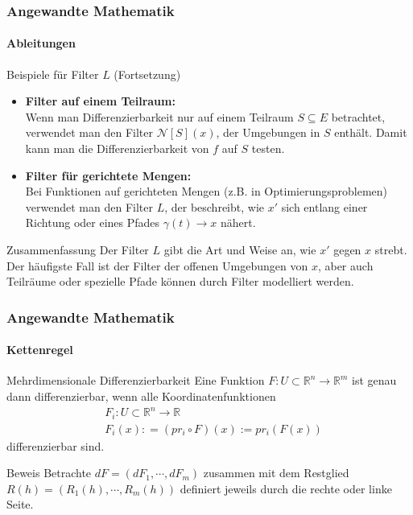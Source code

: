 \documentclass{beamer}
\begin{document}
\begin{frame}
    \frametitle{Angewandte Mathematik}
    \framesubtitle{Ableitungen}

\begin{block}{Beispiele für Filter \( L \) (Fortsetzung)}
  \begin{itemize}
      
    \item \textbf{Filter auf einem Teilraum:} \\
    Wenn man Differenzierbarkeit nur auf einem Teilraum \( S \subseteq E \) betrachtet, 
    verwendet man den Filter \( \mathcal{N}[S](x) \), der Umgebungen in \( S \) enthält. Damit kann man die Differenzierbarkeit von \( f \) auf \( S \) testen.
  
    \item \textbf{Filter für gerichtete Mengen:} \\
    Bei Funktionen auf gerichteten Mengen (z.B. in Optimierungsproblemen) verwendet man den Filter \( L \), der beschreibt, wie \( x' \) sich entlang einer Richtung oder eines Pfades \( \gamma(t) \to x \) nähert.
  \end{itemize}
\end{block}

\vspace{-0.5cm} %

\begin{block}{Zusammenfassung}
  Der Filter \( L \) gibt die Art und Weise an, wie \( x' \) gegen \( x \) strebt. Der häufigste Fall ist der Filter der offenen Umgebungen von \( x \), aber auch Teilräume oder spezielle Pfade können durch Filter modelliert werden.
\end{block}

\end{frame}



\begin{frame}
    \frametitle{Angewandte Mathematik}
\framesubtitle{Kettenregel}

    \begin{block}{Mehrdimensionale Differenzierbarkeit}
Eine Funktion $F: U \subset \mathbb{R}^n \to \mathbb{R}^m$ ist genau dann differenzierbar, wenn alle Koordinatenfunktionen
\begin{align*}
& F_i :U \subset \mathbb{R}^n \to \mathbb{R} \\
& F_i(x): = (pr_i \circ F) (x) := pr_i(F(x))
\end{align*}
differenzierbar sind.
\end{block}
    
\begin{block}{Beweis}
    Betrachte $dF = (dF_1, \cdots, dF_m) $ zusammen mit dem  Restglied $R(h)  = (R_1(h), \cdots, R_m(h))$ definiert jeweils durch die rechte oder linke Seite.
    \end{block}
 \end{frame}
\end{document}
